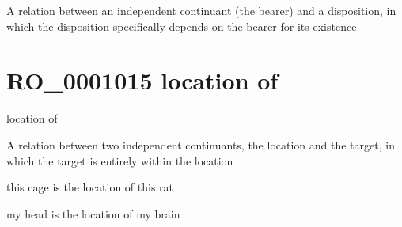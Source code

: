 \documentclass[letterpaper,10pt,english]{sphinxmanual}
\begin{document}
\begin{sphinxShadowBox}

\sphinxAtStartPar
A relation between an independent continuant (the bearer) and a disposition, in which the disposition specifically depends on the bearer for its existence
\end{sphinxShadowBox}

\begin{sphinxShadowBox}

\sphinxAtStartPar
{}
\end{sphinxShadowBox}
\begin{quote}
\label{\detokenize{doc-RO_0001015:ro-0001015}}\label{\detokenize{doc-RO_0001015:location-of}}\label{\detokenize{doc-RO_0001015:ro-0001015}}
\ignorespaces \end{quote}


\section{RO\_0001015 \sphinxhyphen{} location of}
\label{\detokenize{doc-RO_0001015:ro-0001015-location-of}}\label{\detokenize{doc-RO_0001015:index-0}}\label{\detokenize{doc-RO_0001015::doc}}
\begin{sphinxShadowBox}

\sphinxAtStartPar
location of
\end{sphinxShadowBox}

\begin{sphinxShadowBox}

\sphinxAtStartPar
A relation between two independent continuants, the location and the target, in which the target is entirely within the location
\end{sphinxShadowBox}

\begin{sphinxShadowBox}

\sphinxAtStartPar
this cage is the location of this rat

\sphinxAtStartPar
my head is the location of my brain
\end{sphinxShadowBox}
\end{document}
